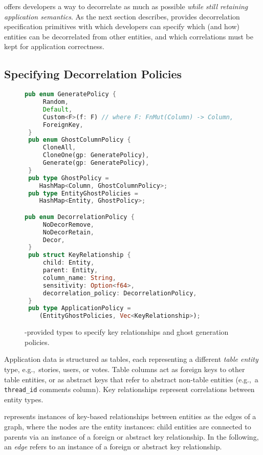 \sys{} offers developers a way to decorrelate as much as possible \emph{while still retaining
application semantics}. As the next section describes, \sys{} provides decorrelation specification
primitives with which developers can specify which (and how) entities can be decorrelated from other
entities, and which correlations must be kept for application correctness.

\subsection{Specifying Decorrelation Policies}

\begin{figure}
\begin{lstlisting}[language=Rust]
 pub enum GeneratePolicy {
     Random,
     Default,
     Custom<F>(f: F) // where F: FnMut(Column) -> Column,
     ForeignKey, 
 }
 pub enum GhostColumnPolicy {
     CloneAll,
     CloneOne(gp: GeneratePolicy),
     Generate(gp: GeneratePolicy),
 }
 pub type GhostPolicy = 
    HashMap<Column, GhostColumnPolicy>;
 pub type EntityGhostPolicies = 
    HashMap<Entity, GhostPolicy>;

pub enum DecorrelationPolicy {
     NoDecorRemove,
     NoDecorRetain,
     Decor,
 }
 pub struct KeyRelationship {
     child: Entity,
     parent: Entity,
     column_name: String,
     sensitivity: Option<f64>,
     decorrelation_policy: DecorrelationPolicy,
 }
 pub type ApplicationPolicy = 
    (EntityGhostPolicies, Vec<KeyRelationship>);
\end{lstlisting}
    \caption{\sys{}-provided types to specify key relationships and ghost generation policies.}
\end{figure}

Application data is structured as tables, each representing a different \emph{table entity} type,
e.g.,\ stories, users, or votes. Table columns act as foreign keys to other table entities, or as
abstract keys that refer to abstract non-table entities (e.g.,\ a \texttt{thread\_id} comments column). 
Key relationships represent correlations between entity types.

\sys{} represents instances of key-based relationships between entities as the edges of a graph,
where the nodes are the entity instances: child entities are connected to parents via an instance of
a foreign or abstract key relationship. In the following, an \emph{edge} refers to an instance of a
foreign or abstract key relationship.

